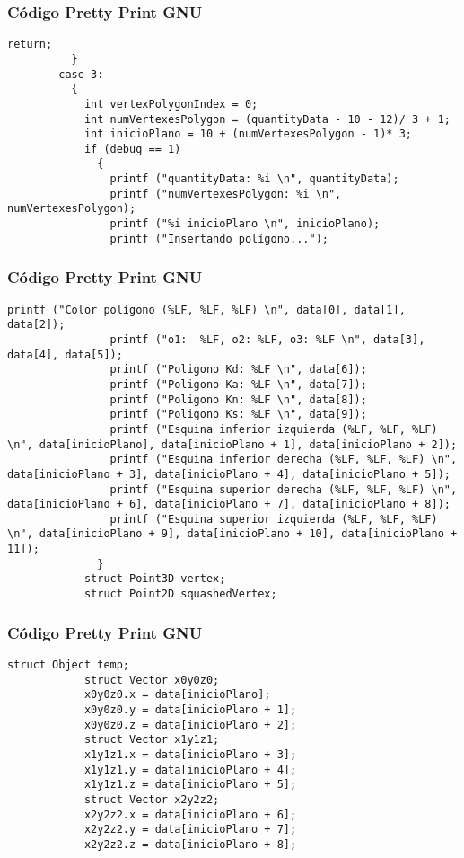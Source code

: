 \documentclass{beamer}
\begin{document}
\begin{frame}[fragile]
\frametitle{C\'odigo Pretty Print GNU}
\begin{lstlisting}[style=CStyle]
            return;
          }
        case 3:
          {
            int vertexPolygonIndex = 0;
            int numVertexesPolygon = (quantityData - 10 - 12)/ 3 + 1;
            int inicioPlano = 10 + (numVertexesPolygon - 1)* 3;
            if (debug == 1)
              {
                printf ("quantityData: %i \n", quantityData);
                printf ("numVertexesPolygon: %i \n", numVertexesPolygon);
                printf ("%i inicioPlano \n", inicioPlano);
                printf ("Insertando polígono...");
\end{lstlisting}
\end{frame}
\begin{frame}[fragile]
\frametitle{C\'odigo Pretty Print GNU}
\begin{lstlisting}[style=CStyle]
                printf ("Color polígono (%LF, %LF, %LF) \n", data[0], data[1], data[2]);
                printf ("o1:  %LF, o2: %LF, o3: %LF \n", data[3], data[4], data[5]);
                printf ("Poligono Kd: %LF \n", data[6]);
                printf ("Poligono Ka: %LF \n", data[7]);
                printf ("Poligono Kn: %LF \n", data[8]);
                printf ("Poligono Ks: %LF \n", data[9]);
                printf ("Esquina inferior izquierda (%LF, %LF, %LF) \n", data[inicioPlano], data[inicioPlano + 1], data[inicioPlano + 2]);
                printf ("Esquina inferior derecha (%LF, %LF, %LF) \n", data[inicioPlano + 3], data[inicioPlano + 4], data[inicioPlano + 5]);
                printf ("Esquina superior derecha (%LF, %LF, %LF) \n", data[inicioPlano + 6], data[inicioPlano + 7], data[inicioPlano + 8]);
                printf ("Esquina superior izquierda (%LF, %LF, %LF) \n", data[inicioPlano + 9], data[inicioPlano + 10], data[inicioPlano + 11]);
              }
            struct Point3D vertex;
            struct Point2D squashedVertex;
\end{lstlisting}
\end{frame}
\begin{frame}[fragile]
\frametitle{C\'odigo Pretty Print GNU}
\begin{lstlisting}[style=CStyle]
            struct Object temp;
            struct Vector x0y0z0;
            x0y0z0.x = data[inicioPlano];
            x0y0z0.y = data[inicioPlano + 1];
            x0y0z0.z = data[inicioPlano + 2];
            struct Vector x1y1z1;
            x1y1z1.x = data[inicioPlano + 3];
            x1y1z1.y = data[inicioPlano + 4];
            x1y1z1.z = data[inicioPlano + 5];
            struct Vector x2y2z2;
            x2y2z2.x = data[inicioPlano + 6];
            x2y2z2.y = data[inicioPlano + 7];
            x2y2z2.z = data[inicioPlano + 8];
\end{lstlisting}
\end{frame}
\end{document}
